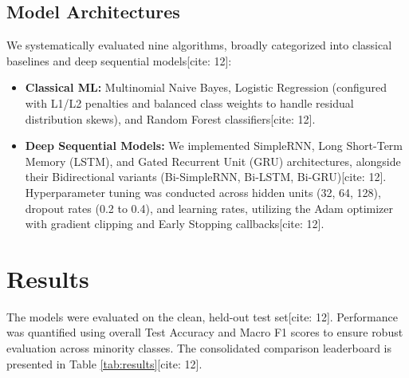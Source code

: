 \documentclass[11pt]{article}
\begin{document}
\subsection{Model Architectures}
We systematically evaluated nine algorithms, broadly categorized into classical baselines and deep sequential models[cite: 12]:
\begin{itemize}
    \item \textbf{Classical ML:} Multinomial Naive Bayes, Logistic Regression (configured with L1/L2 penalties and balanced class weights to handle residual distribution skews), and Random Forest classifiers[cite: 12].
    \item \textbf{Deep Sequential Models:} We implemented SimpleRNN, Long Short-Term Memory (LSTM), and Gated Recurrent Unit (GRU) architectures, alongside their Bidirectional variants (Bi-SimpleRNN, Bi-LSTM, Bi-GRU)[cite: 12]. Hyperparameter tuning was conducted across hidden units (32, 64, 128), dropout rates (0.2 to 0.4), and learning rates, utilizing the Adam optimizer with gradient clipping and Early Stopping callbacks[cite: 12].
\end{itemize}

\section{Results}
The models were evaluated on the clean, held-out test set[cite: 12]. Performance was quantified using overall Test Accuracy and Macro F1 scores to ensure robust evaluation across minority classes. The consolidated comparison leaderboard is presented in Table \ref{tab:results}[cite: 12].

\begin{table}[h]
  \centering
  \caption{Final Test Set Comparison Leaderboard[cite: 12].}
  \label{tab:results}
\end{table}
\end{document}
